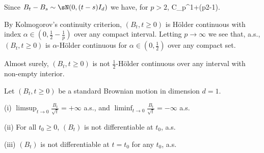 

Since $B_t - B_s \sim \sN (0, (t -s)I_d )$ we have, for $p > 2$,
\be
\E[\abs{B_t - B_s}^p] \leq C_p^{1+(\frac p2-1)}.
\ee

By Kolmogorov's continuity criterion, $(B_t , t \geq 0)$ is H\"older continuous with index $\alpha \in (0, \frac 12- \frac 1p)$ over any compact interval. Letting $p \to \infty$ we see that, a.s., $(B_t, t \geq 0)$ is $\alpha$-H\"older continuous for $\alpha \in (0, \frac 12)$ over any compact set.

\begin{proposition}
Almost surely, $(B_t , t \geq 0)$ is not $\frac 12$-H\"older continuous over any interval with non-empty interior.
\end{proposition}

\begin{proposition}
Let $(B_t , t \geq 0)$ be a standard Brownian motion in dimension $d = 1$.
\ben
\item [(i)] $\limsup_{t\to 0} \frac{B_t}{\sqrt{t}} = +\infty$ a.s., and $\liminf_{t\to 0} \frac{B_t}{\sqrt{t}} = -\infty$ a.s.
\item [(ii)] For all $t_0 \geq 0$, $(B_t)$ is not differentiable at $t_0$, a.s.
\item [(iii)] $(B_t)$ is not differentiable at $t = t_0$ for any $t_0$, a.s.
\een
\end{proposition}

